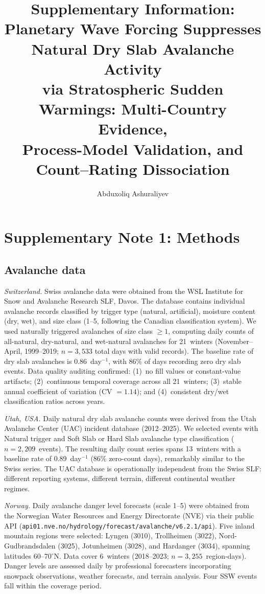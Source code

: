 \documentclass[11pt,letterpaper]{article}
\title{Supplementary Information:\\
Planetary Wave Forcing Suppresses Natural Dry Slab Avalanche Activity\\
via Stratospheric Sudden Warmings: Multi-Country Evidence,\\
Process-Model Validation, and Count--Rating Dissociation}
\author{Abduxoliq Ashuraliyev}
\date{}
\begin{document}
\maketitle

\tableofcontents
\clearpage

\section{Supplementary Note 1: Methods}

\subsection{Avalanche data}

\textit{Switzerland.} Swiss avalanche data were obtained from the WSL Institute for Snow and Avalanche Research SLF, Davos. The database contains individual avalanche records classified by trigger type (natural, artificial), moisture content (dry, wet), and size class (1--5, following the Canadian classification system). We used naturally triggered avalanches of size class $\geq 1$, computing daily counts of all-natural, dry-natural, and wet-natural avalanches for 21~winters (November--April, 1999--2019; $n = 3{,}533$ total days with valid records). The baseline rate of dry slab avalanches is 0.86~day$^{-1}$, with 86\% of days recording zero dry slab events. Data quality auditing confirmed: (1)~no fill values or constant-value artifacts; (2)~continuous temporal coverage across all 21~winters; (3)~stable annual coefficient of variation (CV $= 1.14$); and (4)~consistent dry/wet classification ratios across years.

\textit{Utah, USA.} Daily natural dry slab avalanche counts were derived from the Utah Avalanche Center (UAC) incident database (2012--2025). We selected events with Natural trigger and Soft Slab or Hard Slab avalanche type classification ($n = 2{,}209$~events). The resulting daily count series spans 13~winters with a baseline rate of 0.89~day$^{-1}$ (86\% zero-count days), remarkably similar to the Swiss series. The UAC database is operationally independent from the Swiss SLF: different reporting systems, different terrain, different continental weather regimes.

\textit{Norway.} Daily avalanche danger level forecasts (scale 1--5) were obtained from the Norwegian Water Resources and Energy Directorate (NVE) via their public API (\texttt{api01.nve.no/hydrology/forecast/avalanche/v6.2.1/api}). Five inland mountain regions were selected: Lyngen (3010), Trollheimen (3022), Nord-Gudbrandsdalen (3025), Jotunheimen (3028), and Hardanger (3034), spanning latitudes 60--70$^\circ$N. Data cover 6~winters (2018--2023; $n = 3{,}255$~region-days). Danger levels are assessed daily by professional forecasters incorporating snowpack observations, weather forecasts, and terrain analysis. Four SSW events fall within the coverage period.
\end{document}
